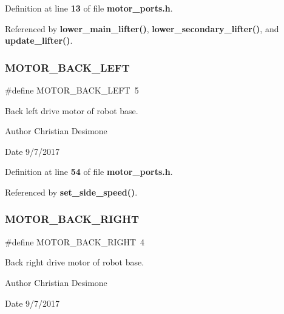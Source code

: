 Definition at line \textbf{ 13} of file \textbf{ motor\+\_\+ports.\+h}.



Referenced by \textbf{ lower\+\_\+main\+\_\+lifter()}, \textbf{ lower\+\_\+secondary\+\_\+lifter()}, and \textbf{ update\+\_\+lifter()}.

\mbox{\label{motor__ports_8h_a36e9fda07b5cd4408170fe907b75a8b7}} 
\subsubsection{M\+O\+T\+O\+R\+\_\+\+B\+A\+C\+K\+\_\+\+L\+E\+FT}
{\footnotesize\ttfamily \#define M\+O\+T\+O\+R\+\_\+\+B\+A\+C\+K\+\_\+\+L\+E\+FT~5}



Back left drive motor of robot base. 

\begin{DoxyAuthor}{Author}
Christian Desimone 
\end{DoxyAuthor}
\begin{DoxyDate}{Date}
9/7/2017 
\end{DoxyDate}


Definition at line \textbf{ 54} of file \textbf{ motor\+\_\+ports.\+h}.



Referenced by \textbf{ set\+\_\+side\+\_\+speed()}.

\mbox{\label{motor__ports_8h_ad85c5f3d6a2d00789c8c67b960c46c2b}} 
\subsubsection{M\+O\+T\+O\+R\+\_\+\+B\+A\+C\+K\+\_\+\+R\+I\+G\+HT}
{\footnotesize\ttfamily \#define M\+O\+T\+O\+R\+\_\+\+B\+A\+C\+K\+\_\+\+R\+I\+G\+HT~4}



Back right drive motor of robot base. 

\begin{DoxyAuthor}{Author}
Christian Desimone 
\end{DoxyAuthor}
\begin{DoxyDate}{Date}
9/7/2017 
\end{DoxyDate}


